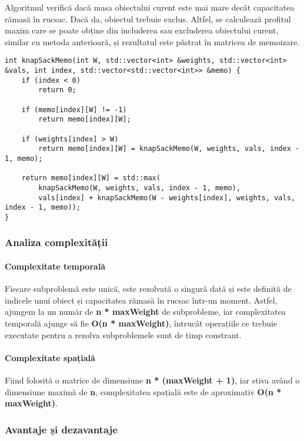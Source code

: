 \documentclass[runningheads]{llncs}
\begin{document}
Algoritmul verifică dacă masa obiectului curent este mai mare decât capacitatea rămasă
în rucsac. Dacă da, obiectul trebuie exclus. Altfel, se calculează profitul maxim care
se poate obține din includerea sau excluderea obiectului curent, similar cu metoda anterioară,
și rezultatul este păstrat în matricea de memoizare.

\begin{lstlisting}
int knapSackMemo(int W, std::vector<int> &weights, std::vector<int> &vals, int index, std::vector<std::vector<int>> &memo) {
	if (index < 0)
		return 0;
	
	if (memo[index][W] != -1)
		return memo[index][W];

	if (weights[index] > W)
		return memo[index][W] = knapSackMemo(W, weights, vals, index - 1, memo);

	return memo[index][W] = std::max(
		knapSackMemo(W, weights, vals, index - 1, memo),
		vals[index] + knapSackMemo(W - weights[index], weights, vals, index - 1, memo));
}
\end{lstlisting}

\subsubsection{Analiza complexității}

\paragraph{Complexitate temporală} Fiecare subproblemă este unică, este rezolvată o singură
dată și este definită de indicele unui obiect și capacitatea rămasă în rucsac într-un moment.
Astfel, ajungem la un număr de \textbf{n * maxWeight} de subprobleme, iar complexitatea
temporală ajunge să fie \textbf{O(n * maxWeight)}, întrucât operațiile ce trebuie executate
pentru a rezolva subproblemele sunt de timp constrant.

\paragraph{Complexitate spațială} Fiind folosită o matrice de dimensiune \textbf{n * (maxWeight + 1)},
iar stiva având o dimensiune maximă de \textbf{n}, complexitatea spațială este de aproximativ
\textbf{O(n * maxWeight)}.

\subsubsection{Avantaje și dezavantaje}
\end{document}
